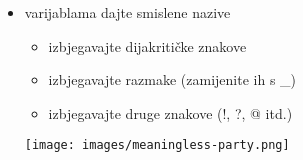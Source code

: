 \documentclass[aspectratio=169]{beamer}
\begin{document}
\begin{frame}
    \begin{itemize}
        \setlength{\itemsep}{2em}

        \item varijablama dajte smislene nazive

            \begin{itemize}
                \item izbjegavajte dijakritičke znakove

                \item izbjegavajte razmake (zamijenite ih s \_)

                \item izbjegavajte druge znakove (!, ?, @ itd.)

            \end{itemize}

            \pause

            \vspace*{1.5em}

            \begin{center}

            \texttt{[image: images/meaningless-party.png]}

            \end{center}

    \end{itemize}
\end{frame}
\end{document}

